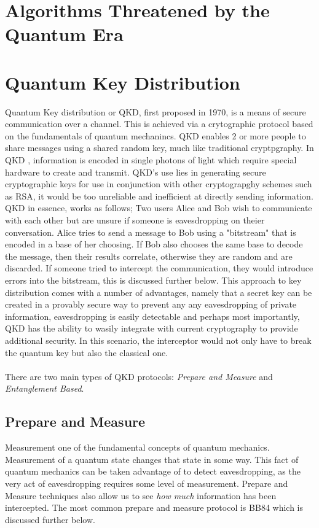 \documentclass[journal]{IEEEtran}
\begin{document}
\section{Algorithms Threatened by the Quantum Era}

\section{Quantum Key Distribution}
Quantum Key distribution or QKD, first proposed in 1970, is a means of secure communication over a channel. This is achieved via a crytographic protocol based on the fundamentals of quantum mechanincs.
QKD enables 2 or more people to share messages using a shared random key, much like traditional cryptpgraphy. In QKD , information is encoded in single photons of light which require special hardware to create and transmit.
QKD's use lies in generating secure cryptographic keys for use in conjunction with other cryptograpghy schemes such as RSA, it would be too unreliable and inefficient at directly sending information.
QKD in essence, works as follows; Two users Alice and Bob wish to communicate with each other but are unsure if someone is eavesdropping on theier conversation. Alice tries to send a message to Bob using a "bitstream" that is encoded in a base of 
her choosing. If Bob also chooses the same base to decode the message, then their results correlate, otherwise they are random and are discarded. If someone tried to intercept the communication, they would introduce errors into the bitstream, this is discussed further below.
This approach to key distribution comes with a number of advantages, namely that a secret key can be created in a provably secure way to prevent any any eavesdropping of private information, eavesdropping is easily detectable and perhaps most importantly, QKD has the ability to 
wasily integrate with current cryptography to provide additional security. In this scenario, the interceptor would not only have to break the quantum key but also the classical one. \\ \\
There are two main types of QKD protocols: \emph{Prepare and Measure} and \emph{Entanglement Based}.
\subsection{Prepare and Measure}
Measurement one of the fundamental concepts of quantum mechanics. Measurement of a quantum state changes that state in some way. This fact of quantum mechanics can be taken advantage of to detect eavesdropping,
as the very act of eavesdropping requires some level of measurement. Prepare and Measure techniques also allow us to see \emph{how much} information has been intercepted. The most common prepare and measure protocol is BB84 which is discussed further below.
\end{document}
